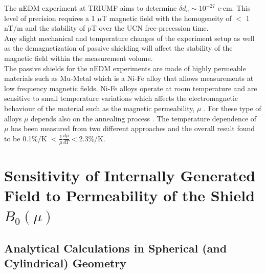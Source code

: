 \documentclass[review]{elsarticle}
\begin{document}
The nEDM experiment at TRIUMF aims to determine $\delta d_n \sim 10^{-27}$ e$\cdot$cm. This level of precision requires a 1 $\mu$T magnetic field with the homogeneity of $<$ 1 nT/m and the stability of pT over the UCN free-precession time.\\
Any slight mechanical and temperature changes of the experiment setup as well as the demagnetization of passive shielding will affect the stability of the magnetic field within the measurement volume.\\
The passive shields for the nEDM experiments are made of highly permeable materials such as Mu-Metal which is a Ni-Fe alloy that allows measurements at low frequency magnetic fields. Ni-Fe alloys operate at room temperature and are sensitive to small temperature variations which affects the electromagnetic behaviour of the material such as the magnetic permeability, $\mu$ \cite{bib:couderchon}. For these type of alloys $\mu$ depends also on the annealing process \cite{bib:gupta}. The temperature dependence of $\mu$ has been measured from two different approaches and the overall result found to be 0.1\%/K $<\frac{1}{\mu} \frac{d\mu}{dT}<$2.3\%/K.


\section{Sensitivity of Internally Generated Field to Permeability of the Shield $B_0(\mu)$}

\subsection{Analytical Calculations in Spherical (and Cylindrical) Geometry}

\end{document}
